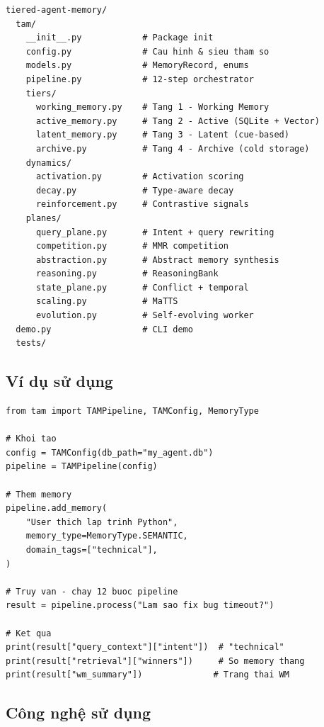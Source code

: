 \documentclass[a4paper,12pt]{article}
\begin{document}
\begin{lstlisting}[language={},basicstyle=\ttfamily\footnotesize]
tiered-agent-memory/
  tam/
    __init__.py            # Package init
    config.py              # Cau hinh & sieu tham so
    models.py              # MemoryRecord, enums
    pipeline.py            # 12-step orchestrator
    tiers/
      working_memory.py    # Tang 1 - Working Memory
      active_memory.py     # Tang 2 - Active (SQLite + Vector)
      latent_memory.py     # Tang 3 - Latent (cue-based)
      archive.py           # Tang 4 - Archive (cold storage)
    dynamics/
      activation.py        # Activation scoring
      decay.py             # Type-aware decay
      reinforcement.py     # Contrastive signals
    planes/
      query_plane.py       # Intent + query rewriting
      competition.py       # MMR competition
      abstraction.py       # Abstract memory synthesis
      reasoning.py         # ReasoningBank
      state_plane.py       # Conflict + temporal
      scaling.py           # MaTTS
      evolution.py         # Self-evolving worker
  demo.py                  # CLI demo
  tests/
\end{lstlisting}

\subsection*{Ví dụ sử dụng}

\begin{lstlisting}[caption={Khởi tạo và truy vấn TAM Pipeline}]
from tam import TAMPipeline, TAMConfig, MemoryType

# Khoi tao
config = TAMConfig(db_path="my_agent.db")
pipeline = TAMPipeline(config)

# Them memory
pipeline.add_memory(
    "User thich lap trinh Python",
    memory_type=MemoryType.SEMANTIC,
    domain_tags=["technical"],
)

# Truy van - chay 12 buoc pipeline
result = pipeline.process("Lam sao fix bug timeout?")

# Ket qua
print(result["query_context"]["intent"])  # "technical"
print(result["retrieval"]["winners"])     # So memory thang
print(result["wm_summary"])              # Trang thai WM
\end{lstlisting}

\subsection*{Công nghệ sử dụng}
\end{document}
